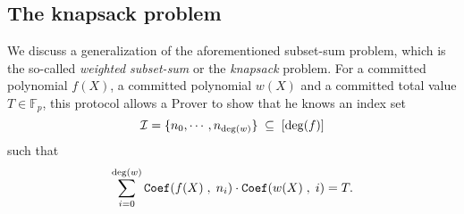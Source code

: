 \documentclass[11pt, lettersize, notitlepage, leqno, footskip=0.6cm]{article}
\newcommand{\bFp}{\mathbb{F}_p}
\newcommand{\wti}{\widetilde}
\newcommand{\mc}{\mathcal}
\newcommand{\mbf}{\mathbf}
\newcommand{\what}{\widehat}
\newcommand{\sub}{\subseteq}
\newcommand{\mP}{\mc{P}}
\newcommand{\V}{\mc{V}}
\newcommand{\vs}{\vspace{-0.15cm}}
\newcommand{\sta}{\stackrel{?}{=}}
\newcommand{\e}{\mbf{e}}
\numberwithin{equation}{section}
\begin{document}
\begin{comment}
\item $\mP$ computes the polynomial \vspace{-2mm} $$ \wti{f}(X):= \sum\limits_{i=0}^{\deg(f)+1} \prod\limits_{j=0}^{i-1} (c_i+\gamma)\cdot  X^i  $$ and sends the elements \vs $$\wti{a}:= g_1^{\wti{f}(s)}\;\;,\;\;\what{a}:= g_1^{[\wti{f}(s)-1]\big/[s-1]} .$$

\item $\mP$ sends a proof for $\hyperlink{ZKPoKE}{\tt{ZKPoKE}}[g_1^{s},\;\wti{a}\cdot g_1^{-1}] $

\item $\mP$ sends a proof for $\hyperlink{HadProd}{\tt{ZKPoHadProd}}[g_1,\;({a}_{\gamma},\;\wti{a}),\;\what{a}] $

\item $\mP$ sends a proof for $\hyperlink{Coeff}{\tt{ZKPoCoef}}[g_1,\;(\wti{a},\; a_{\deg}\cdot g_1,\; A)] $.

\item The Verifier $\V$ verifies the $\hyperlink{ZKPoKE}{\tt{ZKPoKE}}$, $\hyperlink{Coeff}{\tt{ZKPoCoef}}$, the $\hyperlink{Deg}{\tt{ZKPoDeg}}$s, the $\hyperlink{HadProd}{\tt{ZKPoHadProd}}$ and the (batchable) equations \vs $$ \e(\what{a}\;,\;g_2^{s-1})\;\sta\; \e(\wti{a}\cdot g_1^{-1}\;,\;g_2)\;\;,\;\;\e(\wti{g}_1\cdot g_1^{s-1}\;,\;g_2)\sta \e(a^{-1}\cdot a_{\gamma}\;,\;g_2^{s-1}). \vspace{-3mm} $$ \qed \end{enumerate} \end{mdframed} 



\end{comment}










\subsection{\fontsize{11}{11}\selectfont The knapsack problem}


We discuss a generalization of the aforementioned subset-sum problem, which is the so-called \textit{weighted subset-sum} or the \textit{knapsack} problem. For a committed polynomial $f(X)$, a committed polynomial $w(X)$ and a committed total value $T\in \bFp$, this protocol allows a Prover to show that he knows an index set \vs $$\mc{I} = \{n_0,\cdots,n_{\deg(w)} \}\;\sub\; [\deg(f)] \vs $$ such that \vs $$ \sum\limits_{i= 0}^{\deg(w)} {\tt{Coef}}(f(X)\;,\;n_i)\cdot {\tt{Coef}}(w(X)\;,\;i) = T . $$ 
\end{document}
